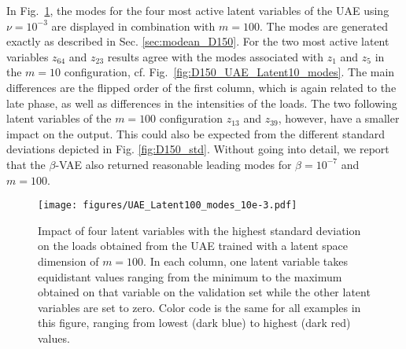 In Fig.~\ref{fig:D150_UAE_Latent100_modes}, the modes for the four most active latent variables of the UAE using $\nu=10^{-3}$ are displayed in combination with $m=100$. The modes are generated exactly as described in Sec. \ref{sec:modean_D150}. For the two most active latent variables $z_{64}$ and $z_{23}$ results agree with the modes associated with $z_1$ and $z_5$ in the $m=10$ configuration, cf. Fig.~\ref{fig:D150_UAE_Latent10_modes}. The main differences are the flipped order of the first column, which is again related to the late phase,  as well as differences in the intensities of the loads.  The two following latent variables of the $m=100$ configuration $z_{13}$ and $z_{39}$, however, have a smaller impact on the output. This could also be expected from the different standard deviations depicted in Fig. \ref{fig:D150_std}.
Without going into detail, we report that the $\beta$-VAE also returned reasonable leading modes for $\beta=10^{-7}$ and $m=100$.

\begin{figure}[h!]
    \centering
    \texttt{[image: figures/UAE\_Latent100\_modes\_10e-3.pdf]}
    \caption{Impact of four latent variables with the highest standard deviation on the loads obtained from the UAE trained with a latent space dimension of $m=100$. In each column,  one latent variable takes equidistant values ranging from the minimum to the maximum obtained on that variable on the validation set while the other latent variables are set to zero.
    Color code is the same for all examples in this figure, ranging from lowest (dark blue) to highest (dark red) values.}
    \label{fig:D150_UAE_Latent100_modes}
\end{figure}